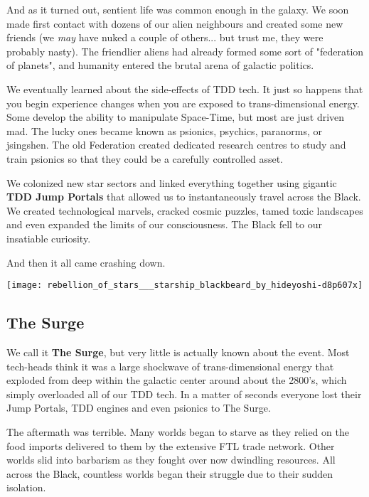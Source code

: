 \begin{multicols}{2}
  And as it turned out, sentient life was common enough in the galaxy. We soon made first contact with dozens of our alien neighbours and created some new friends (we \textit{may} have nuked a couple of others... but trust me, they were probably nasty). The friendlier aliens had already formed some sort of "federation of planets", and humanity entered the brutal arena of galactic politics.
  
  We eventually learned about the side-effects of TDD tech. It just so happens that you begin experience changes when you are exposed to trans-dimensional energy. Some develop the ability to manipulate Space-Time, but most are just driven mad. The lucky ones became known as psionics, psychics, paranorms, or jsingshen. The old Federation created dedicated research centres to study and train psionics so that they could be a carefully controlled asset.
  
  We colonized new star sectors and linked everything together using gigantic \textbf{TDD Jump Portals} that allowed us to instantaneously travel across the Black. We created technological marvels, cracked cosmic puzzles, tamed toxic landscapes and even expanded the limits of our consciousness. The Black fell to our insatiable curiosity.

  And then it all came crashing down.
  
  \vspace{\baselineskip}

  \texttt{[image: rebellion\_of\_stars\_\_\_starship\_blackbeard\_by\_hideyoshi-d8p607x]}
  
  \subsection{The Surge}

  We call it \textbf{The Surge}, but very little is actually known about the event. Most tech-heads think it was a large shockwave of trans-dimensional energy that exploded from deep within the galactic center around about the 2800's, which simply overloaded all of our TDD tech. In a matter of seconds everyone lost their Jump Portals, TDD engines and even psionics to The Surge.

  The aftermath was terrible. Many worlds began to starve as they relied on the food imports delivered to them by the extensive FTL trade network. Other worlds slid into barbarism as they fought over now dwindling resources. All across the Black, countless worlds began their struggle due to their sudden isolation.
  

\end{multicols}
